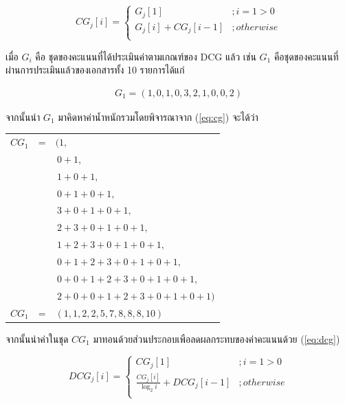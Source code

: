\documentclass[11pt,a4paper]{article}
\begin{document}
{{{\begin{equation}
    CG_j[i] = 
    \begin{cases}
        G_j[1]              &; i = 1 > 0 \\
        G_j[i] + CG_j[i-1]  &; otherwise \\
    \end{cases}
    \label{eq:cg}
\end{equation}

เมื่อ $G_i$ คือ ชุดของคะแนนที่ได้ประเมินค่าตามเกณฑ์ของ DCG แล้ว เช่น $G_1$ คือชุดของคะแนนที่ผ่านการประเมินแล้วของเอกสารทั้ง 10 รายการได้แก่ 

\begin{align*}
    G_1 = (1, 0, 1, 0, 3, 2, 1, 0, 0, 2)
\end{align*}

จากนั้นนำ $G_1$ มาคิดหาค่าน้ำหนักรวมโดยพิจารณาจาก (\ref{eq:cg}) จะได้ว่า

\begin{table}[ht!]
    \centering
    \begin{tabular}{rcl} 
        $CG_1$  &=&$(1,$                                      \\
                & &$\,0 + 1,$                                 \\
                & &$\,1 + 0 + 1,$                             \\
                & &$\,0 + 1 + 0 + 1,$                         \\
                & &$\,3 + 0 + 1 + 0 + 1,$                     \\
                & &$\,2 + 3 + 0 + 1 + 0 + 1,$                 \\
                & &$\,1 + 2 + 3 + 0 + 1 + 0 + 1,$             \\
                & &$\,0 + 1 + 2 + 3 + 0 + 1 + 0 + 1,$         \\
                & &$\,0 + 0 + 1 + 2 + 3 + 0 + 1 + 0 + 1,$     \\
                & &$\,2 + 0 + 0 + 1 + 2 + 3 + 0 + 1 + 0 + 1)$ \\
        $CG_1$  &=&$(1, 1, 2, 2, 5, 7, 8, 8, 8, 10)$
    \end{tabular}
\end{table}

จากนั้นนำค่าในชุด $CG_1$ มาทอนด้วยส่วนประกอบเพือลดผลกระทบของค่าคะแนนด้วย (\ref{eq:dcg})

\begin{equation}
    DCG_j[i] = 
    \begin{cases}
        CG_j[1]                                 &; i = 1 > 0 \\
        \frac{CG_j[i]}{\log_2i} + DCG_j[i-1]    &; otherwise \\
    \end{cases}
    \label{eq:dcg}
\end{equation}

}}}
\end{document}

